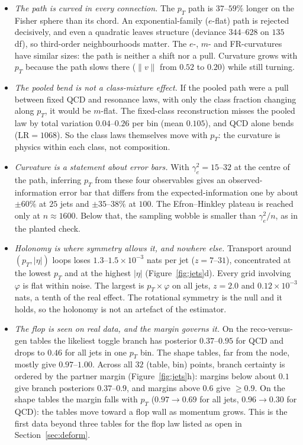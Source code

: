 \documentclass[11pt]{article}
\theoremstyle{definition}
\theoremstyle{remark}
\begin{document}
\begin{itemize}
  \item \emph{The path is curved in every connection.} The $p_T$ path is $37$--$59\%$ longer on the Fisher sphere than its chord. An exponential-family ($e$-flat) path is rejected decisively, and even a quadratic leaves structure (deviance $344$--$628$ on $135$ df), so third-order neighbourhoods matter. The $e$-, $m$- and FR-curvatures have similar sizes: the path is neither a shift nor a pull. Curvature grows with $p_T$ because the path slows there ($\|v\|$ from $0.52$ to $0.20$) while still turning.
  \item \emph{The pooled bend is not a class-mixture effect.} If the pooled path were a pull between fixed QCD and resonance laws, with only the class fraction changing along $p_T$, it would be $m$-flat. The fixed-class reconstruction misses the pooled law by total variation $0.04$--$0.26$ per bin (mean $0.105$), and QCD alone bends ($\mathrm{LR}=1068$). So the class laws themselves move with $p_T$: the curvature is physics within each class, not composition.
  \item \emph{Curvature is a statement about error bars.} With $\gamma^2_e=15$--$32$ at the centre of the path, inferring $p_T$ from these four observables gives an observed-information error bar that differs from the expected-information one by about $\pm60\%$ at $25$ jets and $\pm35$--$38\%$ at $100$. The Efron--Hinkley plateau is reached only at $n\approx1600$. Below that, the sampling wobble is smaller than $\gamma^2_e/n$, as in the planted check.
  \item \emph{Holonomy is where symmetry allows it, and nowhere else.} Transport around $(p_T,|\eta|)$ loops loses $1.3$--$1.5\times10^{-3}$ nats per jet ($z=7$--$31$), concentrated at the lowest $p_T$ and at the highest $|\eta|$ (Figure~\ref{fig:jets}d). Every grid involving $\varphi$ is flat within noise. The largest is $p_T\times\varphi$ on all jets, $z=2.0$ and $0.12\times10^{-3}$ nats, a tenth of the real effect. The rotational symmetry is the null and it holds, so the holonomy is not an artefact of the estimator.
  \item \emph{The flop is seen on real data, and the margin governs it.} On the reco-versus-gen tables the likeliest toggle branch has posterior $0.37$--$0.95$ for QCD and drops to $0.46$ for all jets in one $p_T$ bin. The shape tables, far from the node, mostly give $0.97$--$1.00$. Across all $32$ (table, bin) points, branch certainty is ordered by the partner margin (Figure~\ref{fig:jets}h): margins below about $0.1$ give branch posteriors $0.37$--$0.9$, and margins above $0.6$ give $\ge0.9$. On the shape tables the margin falls with $p_T$ ($0.97\to0.69$ for all jets, $0.96\to0.30$ for QCD): the tables move toward a flop wall as momentum grows. This is the first data beyond three tables for the flop law listed as open in Section~\ref{sec:deform}.

\end{itemize}
\end{document}
